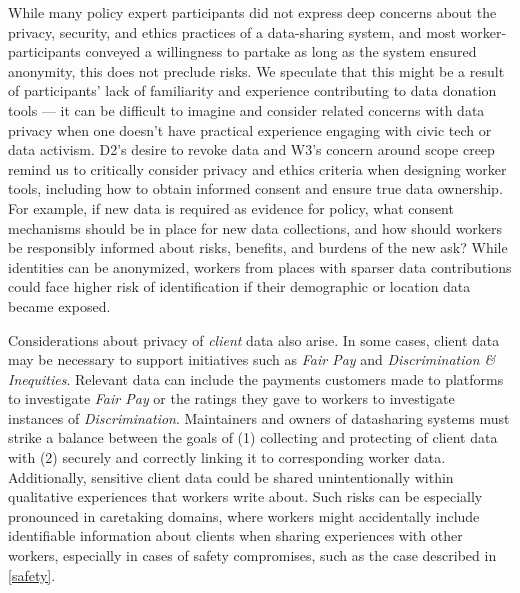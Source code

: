 While many policy expert participants did not express deep concerns about the privacy, security, and ethics practices of a data-sharing system, {and most} worker-participants conveyed a willingness to partake as long as the system ensured anonymity, this does not preclude risks.
{We speculate that this might be a result of participants' lack of familiarity and experience contributing to data donation tools --- it can be difficult to imagine and consider related concerns with data privacy when one doesn't have practical experience engaging with civic tech or data activism.}
D2's desire to revoke data and W3's concern around scope creep remind us to critically consider privacy and ethics criteria when designing worker tools, including how to obtain informed consent and ensure true data ownership. For example, if new data is required as evidence for policy, what consent mechanisms should be in place for new data collections, and how should workers be responsibly informed about risks, benefits, and burdens of the new ask? While identities can be anonymized, workers from places with sparser data contributions could face higher risk of identification if their demographic or location data became exposed. 

{Considerations about privacy of \textit{client} data also arise. In some cases, client data may be necessary to support initiatives such as \textit{Fair Pay} and \textit{Discrimination \& Inequities}. 
Relevant data can include the payments customers made to platforms to investigate \textit{Fair Pay} or the ratings they gave to workers to investigate instances of \textit{Discrimination}. 
Maintainers and owners of datasharing systems must strike a balance between the goals of (1) collecting and protecting of client data with (2) securely and correctly linking it to corresponding worker data.
Additionally, sensitive client data could be shared unintentionally within qualitative experiences that workers write about. Such risks can be especially pronounced in caretaking domains, where workers might accidentally include identifiable information about clients when sharing experiences with other workers, especially in cases of safety compromises, such as the case described in \ref{safety}.}


